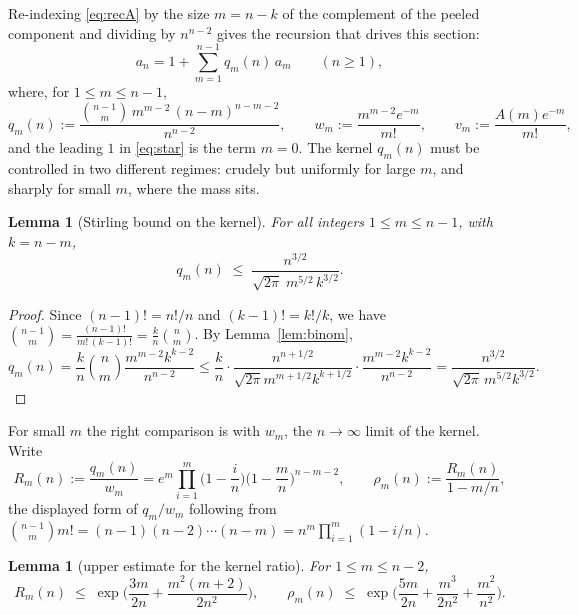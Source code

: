 \documentclass[11pt,a4paper]{amsart}
\theoremstyle{plain}
\newtheorem{lemma}[theorem]{Lemma}
\theoremstyle{definition}
\begin{document}
Re-indexing \eqref{eq:recA} by the size $m=n-k$ of the complement of the peeled
component and dividing by $n^{n-2}$ gives the recursion that drives this section:
\begin{equation}\label{eq:star}
  a_n = 1 + \sum_{m=1}^{n-1} q_m(n)\,a_m \qquad (n \ge 1),
\end{equation}
where, for $1 \le m \le n-1$,
\begin{equation}\label{eq:qdef}
  q_m(n) := \frac{\binom{n-1}{m}\,m^{m-2}\,(n-m)^{n-m-2}}{n^{n-2}},
  \qquad
  w_m := \frac{m^{m-2}e^{-m}}{m!},
  \qquad
  v_m := \frac{A(m)e^{-m}}{m!},
\end{equation}
and the leading $1$ in \eqref{eq:star} is the term $m=0$. The kernel $q_m(n)$
must be controlled in two different regimes: crudely but uniformly for large $m$,
and sharply for small $m$, where the mass sits.

\begin{lemma}[Stirling bound on the kernel]\label{lem:qbound}
For all integers $1 \le m \le n-1$, with $k=n-m$,
\[
  q_m(n) \;\le\; \frac{n^{3/2}}{\sqrt{2\pi}\;m^{5/2}\,k^{3/2}} .
\]
\end{lemma}

\begin{proof}
Since $(n-1)! = n!/n$ and $(k-1)! = k!/k$, we have
$\binom{n-1}{m} = \frac{(n-1)!}{m!\,(k-1)!} = \frac{k}{n}\binom{n}{m}$.
By Lemma~\ref{lem:binom},
\[
  q_m(n) = \frac{k}{n}\binom{n}{m}\frac{m^{m-2}k^{k-2}}{n^{n-2}}
  \le \frac{k}{n}\cdot
      \frac{n^{n+1/2}}{\sqrt{2\pi}m^{m+1/2}k^{k+1/2}}\cdot
      \frac{m^{m-2}k^{k-2}}{n^{n-2}}
  = \frac{n^{3/2}}{\sqrt{2\pi}\,m^{5/2}k^{3/2}} .
\]
\end{proof}

For small $m$ the right comparison is with $w_m$, the $n\to\infty$ limit of the
kernel. Write
\begin{equation}\label{eq:Rdef}
  R_m(n) := \frac{q_m(n)}{w_m}
  = e^{m}\prod_{i=1}^{m}\Big(1-\frac{i}{n}\Big)\Big(1-\frac{m}{n}\Big)^{n-m-2},
  \qquad
  \rho_m(n) := \frac{R_m(n)}{1-m/n} ,
\end{equation}
the displayed form of $q_m/w_m$ following from
$\binom{n-1}{m}m! = (n-1)(n-2)\cdots(n-m) = n^m\prod_{i=1}^m(1-i/n)$.

\begin{lemma}[upper estimate for the kernel ratio]\label{lem:Rup}
For $1 \le m \le n-2$,
\[
  R_m(n) \;\le\; \exp\!\Big(\frac{3m}{2n}+\frac{m^2(m+2)}{2n^2}\Big),
  \qquad
  \rho_m(n) \;\le\; \exp\!\Big(\frac{5m}{2n}+\frac{m^3}{2n^2}+\frac{m^2}{n^2}\Big).
\]
\end{lemma}
\end{document}
